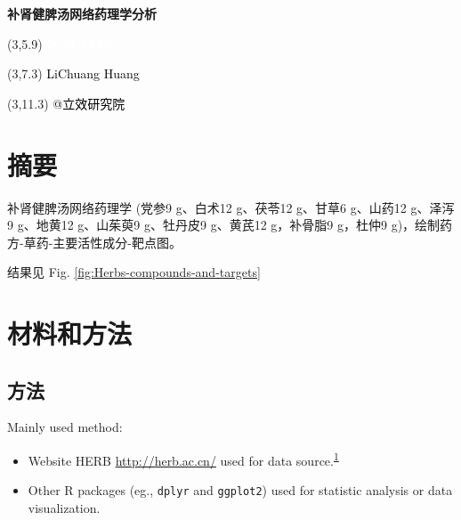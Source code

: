 \documentclass[
]{article}
\author{}
\date{\vspace{-2.5em}}
\providecommand{\tightlist}{%
  \setlength{\itemsep}{0pt}\setlength{\parskip}{0pt}}
\begin{document}
\begin{titlepage} 
\begin{center} \textbf{\Huge
补肾健脾汤网络药理学分析} \vspace{4em}
\begin{textblock}{10}(3,5.9) \huge
\textbf{\textcolor{white}{2023-12-06}}
\end{textblock} \begin{textblock}{10}(3,7.3)
\Large \textcolor{black}{LiChuang Huang}
\end{textblock} \begin{textblock}{10}(3,11.3)
\Large \textcolor{black}{@立效研究院}
\end{textblock} \end{center} \end{titlepage}
\restoregeometry


\tableofcontents

\listoffigures

\listoftables

\newpage


\hypertarget{abstract}{%
\section{摘要}\label{abstract}}

补肾健脾汤网络药理学 (党参9 g、白术12 g、茯苓12 g、甘草6 g、山药12 g、泽泻9 g、地黄12 g、山茱萸9 g、牡丹皮9 g、黄芪12 g，补骨脂9 g，杜仲9 g)，绘制药方-草药-主要活性成分-靶点图。

结果见 Fig. \ref{fig:Herbs-compounds-and-targets}

\hypertarget{methods}{%
\section{材料和方法}\label{methods}}

\hypertarget{ux65b9ux6cd5}{%
\subsection{方法}\label{ux65b9ux6cd5}}

Mainly used method:

\begin{itemize}
\tightlist
\item
  Website HERB \url{http://herb.ac.cn/} used for data source.\textsuperscript{\protect\hyperlink{ref-HerbAHighThFang2021}{1}}
\item
  Other R packages (eg., \texttt{dplyr} and \texttt{ggplot2}) used for statistic analysis or data visualization.
\end{itemize}
\end{document}
